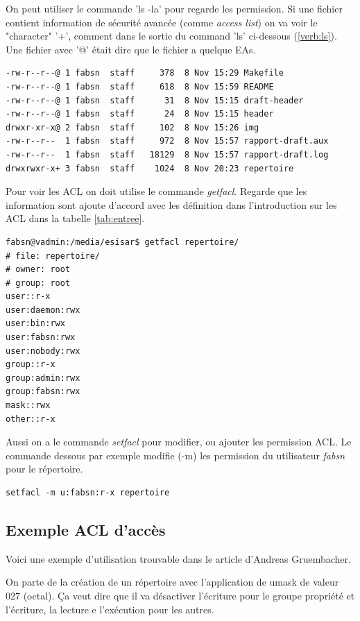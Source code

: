 On peut utiliser le commande 'ls -la' pour regarde les permission. Si une fichier contient information de sécurité avancée (comme \emph{access list}) on va voir le "character" '+', comment dans le sortie du command 'ls' ci-dessous (\ref{verb:ls}). Une fichier avec '@' était dire que le fichier a quelque EAs. 

\begin{center}
\label{verb:ls}
\begin{verbatim}
-rw-r--r--@ 1 fabsn  staff     378  8 Nov 15:29 Makefile
-rw-r--r--@ 1 fabsn  staff     618  8 Nov 15:59 README
-rw-r--r--@ 1 fabsn  staff      31  8 Nov 15:15 draft-header
-rw-r--r--@ 1 fabsn  staff      24  8 Nov 15:15 header
drwxr-xr-x@ 2 fabsn  staff     102  8 Nov 15:26 img
-rw-r--r--  1 fabsn  staff     972  8 Nov 15:57 rapport-draft.aux
-rw-r--r--  1 fabsn  staff   18129  8 Nov 15:57 rapport-draft.log
drwxrwxr-x+ 3 fabsn  staff	  1024  8 Nov 20:23 repertoire
\end{verbatim}
\end{center}

Pour voir les ACL on doit utilise le commande \emph{getfacl}. Regarde que les information sont ajoute d'accord avec les définition dans l'introduction sur les ACL dans la tabelle \ref{tab:entree}. 

\begin{verbatim}
fabsn@vadmin:/media/esisar$ getfacl repertoire/
# file: repertoire/
# owner: root
# group: root
user::r-x
user:daemon:rwx
user:bin:rwx
user:fabsn:rwx
user:nobody:rwx
group::r-x
group:admin:rwx
group:fabsn:rwx
mask::rwx
other::r-x	
\end{verbatim}

Aussi on a le commande \emph{setfacl} pour modifier, ou ajouter les permission ACL. Le commande dessous par exemple modifie (-m) les permission du utilisateur \emph{fabsn} pour le répertoire. 

\begin{verbatim}
setfacl -m u:fabsn:r-x repertoire
\end{verbatim}

\subsection*{Exemple ACL d'accès}

Voici une exemple d'utilisation trouvable dans le article d'Andreas Gruembacher\cite{aclsuse}.

On parte de la création de un répertoire avec l'application de umask de valeur 027 (octal). Ça veut dire que il va   désactiver l'écriture pour le groupe propriété et l'écriture, la lecture e l'exécution pour les autres.

